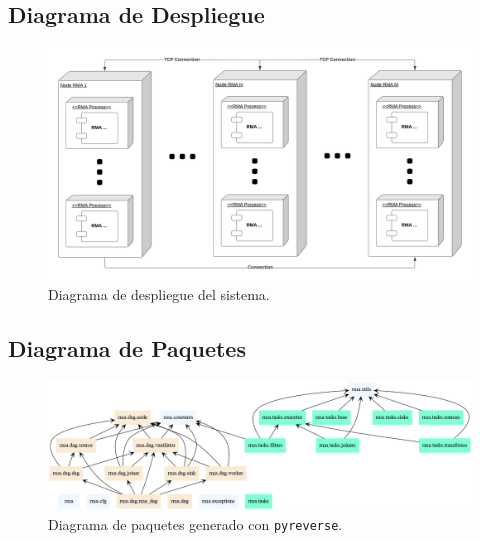 \documentclass[titlepage,a4paper,oneside]{article}
\begin{document}
\subsection{Diagrama de Despliegue}
\begin{figure}[H]
\centering
\includegraphics[width=\textwidth]{images/Despliegue.png}
\caption{Diagrama de despliegue del sistema.}
\end{figure}

\subsection{Diagrama de Paquetes}
\begin{figure}[H]
\centering
\includegraphics[width=\textwidth]{images/packages.png}
\caption{Diagrama de paquetes generado con \texttt{pyreverse}.}
\end{figure}
\end{document}
